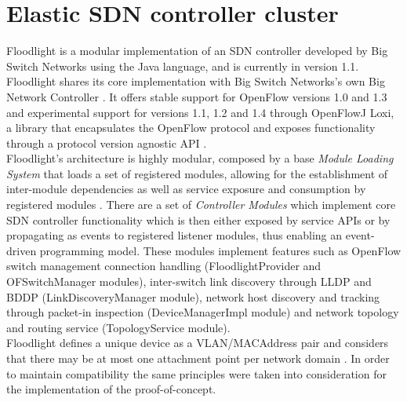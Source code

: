 \section{Elastic SDN controller cluster}
\label{section:SDN-controller-cluster-implementation}
Floodlight is a modular implementation of an \gls{SDN} controller developed by Big Switch Networks using the Java language, and is currently in version 1.1.
Floodlight shares its core implementation with Big Switch Networks's own Big Network Controller \cite{Floodlight}.
It offers stable support for OpenFlow versions 1.0 and 1.3 and experimental support for versions 1.1, 1.2 and 1.4 through OpenFlowJ Loxi, a library that encapsulates the OpenFlow protocol and exposes functionality through a protocol version agnostic \gls{API} \cite{LoxiGen}.\\
Floodlight's architecture is highly modular, composed by a base \emph{Module Loading System} that loads a set of registered modules, allowing for the establishment of inter-module dependencies as well as service exposure and consumption by registered modules \cite{FLArch}.
There are a set of \emph{Controller Modules} which implement core \gls{SDN} controller functionality which is then either exposed by service \glspl{API} or by propagating as events to registered listener modules, thus enabling an event-driven programming model.
These modules implement features such as OpenFlow switch management connection handling (FloodlightProvider and OFSwitchManager modules), inter-switch link discovery through \gls{LLDP} and \gls{BDDP} (LinkDiscoveryManager module), network host discovery and tracking through packet-in inspection (DeviceManagerImpl module) and network topology and routing service (TopologyService module).\\
Floodlight defines a unique device as a \gls{VLAN}/\gls{MACAddress} pair and considers that there may be at most one attachment point per network domain \cite{FLArch}.
In order to maintain compatibility the same principles were taken into consideration for the implementation of the proof-of-concept.\\
%
